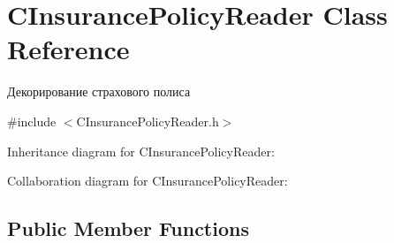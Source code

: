 \hypertarget{classCInsurancePolicyReader}{}\section{C\+Insurance\+Policy\+Reader Class Reference}
\label{classCInsurancePolicyReader}


Декорирование страхового полиса  




{\ttfamily \#include $<$C\+Insurance\+Policy\+Reader.\+h$>$}



Inheritance diagram for C\+Insurance\+Policy\+Reader\+:


Collaboration diagram for C\+Insurance\+Policy\+Reader\+:
\subsection*{Public Member Functions}
